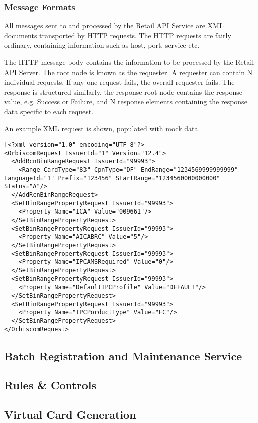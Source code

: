\documentclass[a4paper, 11pt, titlepage]{article}
\begin{document}
\subsubsection{Message Formats} 
All messages sent to and processed by the Retail API Service are XML documents transported by HTTP requests. The HTTP requests are fairly ordinary, containing information such as host, port, service etc. 
 
The HTTP message body contains the information to be processed by the Retail API Server. The root node is known as the requester. A requester can contain N individual requests. If any one request fails, the overall requester fails. The response is structured similarly, the response root node contains the response value, e.g. Success or Failure, and N response elements containing the response data specific to each request. 
 
An example XML request is shown, populated with mock data. 
\begin{verbatim} 
[<?xml version="1.0" encoding="UTF-8"?> 
<OrbiscomRequest IssuerId="1" Version="12.4"> 
  <AddRcnBinRangeRequest IssuerId="99993"> 
    <Range CardType="83" CpnType="DF" EndRange="1234569999999999" LanguageId="1" Prefix="123456" StartRange="1234560000000000" Status="A"/> 
  </AddRcnBinRangeRequest> 
  <SetBinRangePropertyRequest IssuerId="99993"> 
    <Property Name="ICA" Value="009661"/> 
  </SetBinRangePropertyRequest> 
  <SetBinRangePropertyRequest IssuerId="99993"> 
    <Property Name="AICABRC" Value="5"/> 
  </SetBinRangePropertyRequest> 
  <SetBinRangePropertyRequest IssuerId="99993"> 
    <Property Name="IPCAMSRequired" Value="0"/> 
  </SetBinRangePropertyRequest> 
  <SetBinRangePropertyRequest IssuerId="99993"> 
    <Property Name="DefaultIPCProfile" Value="DEFAULT"/> 
  </SetBinRangePropertyRequest> 
  <SetBinRangePropertyRequest IssuerId="99993"> 
    <Property Name="IPCPorductType" Value="FC"/> 
  </SetBinRangePropertyRequest> 
</OrbiscomRequest> 
\end{verbatim} 
 
 
\subsection{Batch Registration and Maintenance Service} 
 
\subsection{Rules \& Controls} 
 
\subsection{Virtual Card Generation} 
 
\end{document}

